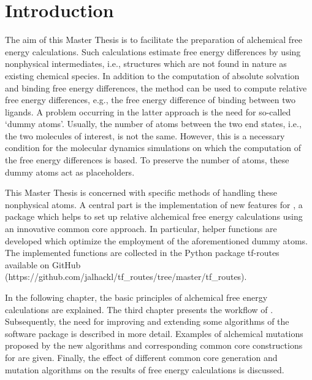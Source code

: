 \chapter{Introduction}

The aim of this Master Thesis is to facilitate the preparation of
alchemical free energy calculations. Such calculations
estimate free energy differences by using nonphysical intermediates, i.e., structures
which are not found in nature as existing chemical species. In addition
to the computation of absolute solvation and binding free energy differences,
the method can be used to compute relative free energy differences, e.g.,
the free energy difference of binding between two ligands. A problem occurring
in the latter approach is the need for so-called \textquoteleft dummy
atoms\textquoteright{}. Usually, the number of atoms between the two
end states, i.e., the two molecules of interest, is not the same.
However, this is a necessary condition for the molecular dynamics
simulations on which the computation of the free energy differences
is based. To preserve the number of atoms, these dummy atoms act as
placeholders\cite{Fleck.2021, Karwounopoulos.2022}.

This Master Thesis is concerned with specific methods of handling these nonphysical
atoms. A central part is the implementation of new features
for \trafo, a package which helps to set up relative alchemical
free energy calculations using an innovative common core approach\cite{key-2, Wieder.2022}.
In particular, helper functions are developed which optimize the employment of
the aforementioned dummy atoms. 
The implemented functions are collected in the  Python package tf-routes available on GitHub (https://github.com/jalhackl/tf\_routes/tree/master/tf\_routes).

In the following chapter, the basic principles of alchemical free energy
calculations are explained. The third chapter presents the workflow
of \trafo. Subsequently, the need for improving and extending some algorithms of the software
package is described in more detail. Examples of alchemical mutations
proposed by the new algorithms and corresponding common core constructions
for \trafo are given. Finally, the effect of different common core generation and mutation
algorithms on the results of free energy calculations is discussed.
